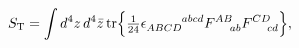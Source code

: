 \begin{equation*}
S_{\rm T} = \int d^4z\, d^4\bar{z}\, {\rm tr} \Bigr\{
\hbox{$\frac{1}{24}$} \epsilon_{ABCD}^{\!~~~~~~~~abcd}
F^{AB}_{\!~~~~ab} F^{CD}_{\!~~~~cd} \Bigr\},
\end{equation*}

